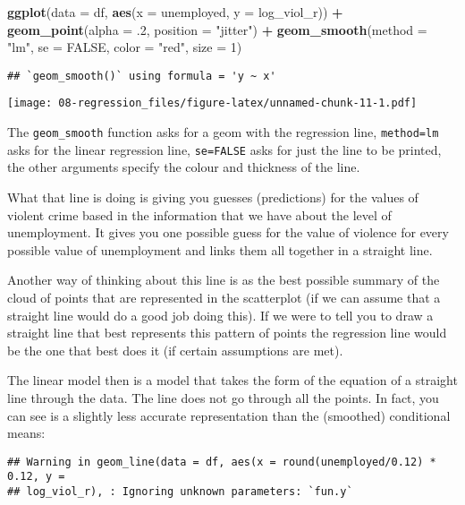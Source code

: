 \documentclass[
]{book}
\newenvironment{Shaded}{\begin{snugshade}}{\end{snugshade}}
\newcommand{\AttributeTok}[1]{\textcolor[rgb]{0.13,0.29,0.53}{#1}}
\newcommand{\ConstantTok}[1]{\textcolor[rgb]{0.56,0.35,0.01}{#1}}
\newcommand{\DecValTok}[1]{\textcolor[rgb]{0.00,0.00,0.81}{#1}}
\newcommand{\FunctionTok}[1]{\textcolor[rgb]{0.13,0.29,0.53}{\textbf{#1}}}
\newcommand{\NormalTok}[1]{#1}
\newcommand{\SpecialCharTok}[1]{\textcolor[rgb]{0.81,0.36,0.00}{\textbf{#1}}}
\newcommand{\StringTok}[1]{\textcolor[rgb]{0.31,0.60,0.02}{#1}}
\begin{document}
\begin{Shaded}
\begin{Highlighting}[]
\FunctionTok{ggplot}\NormalTok{(}\AttributeTok{data =}\NormalTok{ df, }\FunctionTok{aes}\NormalTok{(}\AttributeTok{x =}\NormalTok{ unemployed, }\AttributeTok{y =}\NormalTok{ log\_viol\_r)) }\SpecialCharTok{+}
  \FunctionTok{geom\_point}\NormalTok{(}\AttributeTok{alpha =}\NormalTok{ .}\DecValTok{2}\NormalTok{, }\AttributeTok{position =} \StringTok{"jitter"}\NormalTok{) }\SpecialCharTok{+}
  \FunctionTok{geom\_smooth}\NormalTok{(}\AttributeTok{method =} \StringTok{"lm"}\NormalTok{, }\AttributeTok{se =} \ConstantTok{FALSE}\NormalTok{, }\AttributeTok{color =} \StringTok{"red"}\NormalTok{, }\AttributeTok{size =} \DecValTok{1}\NormalTok{) }
\end{Highlighting}
\end{Shaded}

\begin{verbatim}
## `geom_smooth()` using formula = 'y ~ x'
\end{verbatim}

\texttt{[image: 08-regression\_files/figure-latex/unnamed-chunk-11-1.pdf]}

The \texttt{geom\_smooth} function asks for a geom with the regression line, \texttt{method=lm} asks for the linear regression line, \texttt{se=FALSE} asks for just the line to be printed, the other arguments specify the colour and thickness of the line.

What that line is doing is giving you guesses (predictions) for the values of violent crime based in the information that we have about the level of unemployment. It gives you one possible guess for the value of violence for every possible value of unemployment and links them all together in a straight line.

Another way of thinking about this line is as the best possible summary of the cloud of points that are represented in the scatterplot (if we can assume that a straight line would do a good job doing this). If we were to tell you to draw a straight line that best represents this pattern of points the regression line would be the one that best does it (if certain assumptions are met).

The linear model then is a model that takes the form of the equation of a straight line through the data. The line does not go through all the points. In fact, you can see is a slightly less accurate representation than the (smoothed) conditional means:

\begin{verbatim}
## Warning in geom_line(data = df, aes(x = round(unemployed/0.12) * 0.12, y =
## log_viol_r), : Ignoring unknown parameters: `fun.y`
\end{verbatim}
\end{document}
